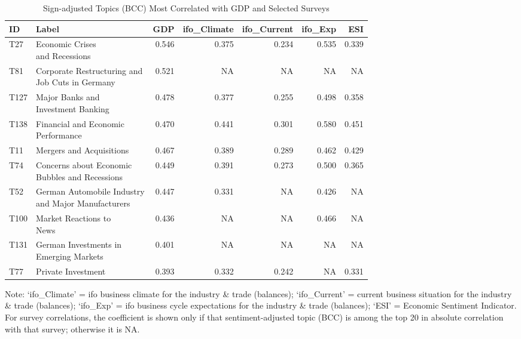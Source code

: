 \begin{table}[h!]
  \centering
  \begin{threeparttable}
    \footnotesize
    \renewcommand{\arraystretch}{1.3}
  \caption{Sign-adjusted Topics (BCC) Most Correlated with GDP and Selected Surveys}
  \label{tab:cor_gdp_topics_bcc_2009_200_all}


\begin{tabular}{llrrrrr}
\hline
ID & Label & GDP & ifo\_Climate & ifo\_Current & ifo\_Exp & ESI\\
\hline
T27 & \makecell[tl]{ Economic Crises \\ and Recessions} & 0.546 & 0.375 & 0.234 & 0.535 & 0.339\\
T81 & \makecell[tl]{ Corporate Restructuring and \\ Job Cuts in Germany} & 0.521 & NA & NA & NA & NA\\
T127 & \makecell[tl]{ Major Banks and \\ Investment Banking} & 0.478 & 0.377 & 0.255 & 0.498 & 0.358\\
T138 & \makecell[tl]{ Financial and Economic \\ Performance} & 0.470 & 0.441 & 0.301 & 0.580 & 0.451\\
T11 & Mergers and Acquisitions & 0.467 & 0.389 & 0.289 & 0.462 & 0.429\\
\addlinespace
T74 & \makecell[tl]{ Concerns about Economic\\ Bubbles and Recessions} & 0.449 & 0.391 & 0.273 & 0.500 & 0.365\\
T52 & \makecell[tl]{ German Automobile Industry \\ and Major Manufacturers} & 0.447 & 0.331 & NA & 0.426 & NA\\
T100 & \makecell[tl]{ Market Reactions to \\News} & 0.436 & NA & NA & 0.466 & NA\\
T131 & \makecell[tl]{German Investments in \\ Emerging Markets} & 0.401 & NA & NA & NA & NA\\
T77 & Private Investment & 0.393 & 0.332 & 0.242 & NA & 0.331\\
\hline
\end{tabular}

    \begin{tablenotes}[flushleft]
      \small \item Note: ‘ifo\_Climate’ = ifo business climate for the industry \& trade (balances); ‘ifo\_Current’ = current business situation for the industry \& trade (balances); ‘ifo\_Exp’ = ifo business cycle expectations for the industry \& trade (balances); ‘ESI’ = Economic Sentiment Indicator. For survey correlations, the coefficient is shown only if that sentiment-adjusted topic (BCC) is among the top 20 in absolute correlation with that survey; otherwise it is NA.
    \end{tablenotes}
  \end{threeparttable}
\end{table}

